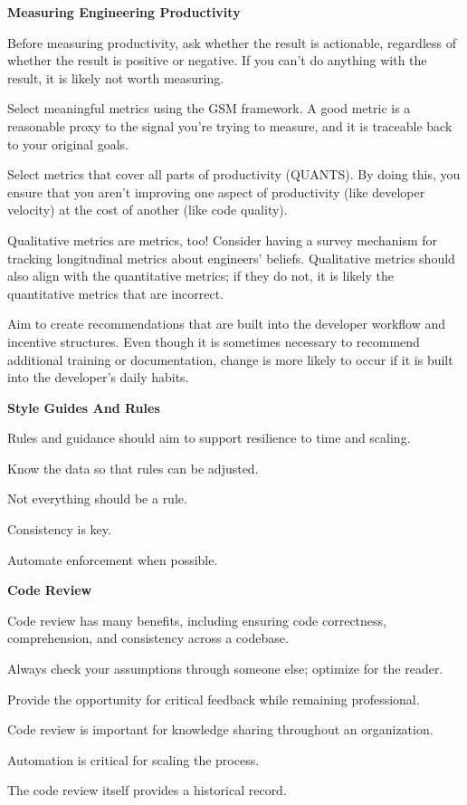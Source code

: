 \item \textbf{Measuring Engineering Productivity}
\bit
\item Before measuring productivity, ask whether the result is actionable, regardless of whether the result is
positive or negative. If you can't do anything with the result, it is likely not worth measuring.
\item Select meaningful metrics using the GSM framework. A good metric is a reasonable proxy to the signal you're
trying to measure, and it is traceable back to your original goals.
\item Select metrics that cover all parts of productivity (QUANTS). By doing this, you ensure that you aren't
improving one aspect of productivity (like developer velocity) at the cost of another (like code quality).
\item Qualitative metrics are metrics, too! Consider having a survey mechanism for tracking longitudinal metrics
about engineers' beliefs. Qualitative metrics should also align with the quantitative metrics; if they do not, it is
likely the quantitative metrics that are incorrect.
\item Aim to create recommendations that are built into the developer workflow and incentive structures. Even though
it is sometimes necessary to recommend additional training or documentation, change is more likely to occur if it is
built into the developer's daily habits.
\eit

\item \textbf{Style Guides And Rules}
\bit
\item Rules and guidance should aim to support resilience to time and scaling.
\item Know the data so that rules can be adjusted.
\item Not everything should be a rule.
\item Consistency is key.
\item Automate enforcement when possible.
\eit


\item \textbf{Code Review}
\bit
\item Code review has many benefits, including ensuring code correctness, comprehension, and consistency across a
codebase.
\item Always check your assumptions through someone else; optimize for the reader.
\item Provide the opportunity for critical feedback while remaining professional.
\item Code review is important for knowledge sharing throughout an organization.
\item Automation is critical for scaling the process.
\item The code review itself provides a historical record.
\eit

